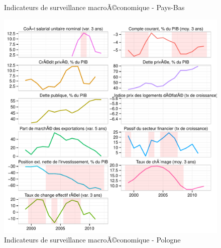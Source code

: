 \documentclass{article}\usepackage[]{graphicx}\usepackage[]{color}
\makeatletter
\def\maxwidth{ %
  \ifdim\Gin@nat@width>\linewidth
    \linewidth
  \else
    \Gin@nat@width
  \fi
}
\newenvironment{knitrout}{}{} %
\makeatother
\begin{document}
\begin{knitrout}
\begin{figure}[p]
{}

\caption[Indicateurs de surveillance macroÃ©conomique - Pays-Bas]{Indicateurs de surveillance macroÃ©conomique - Pays-Bas\label{fig:byco21}}
\end{figure}

\begin{figure}[p]


{\centering \includegraphics[width=\maxwidth]{figure_graph/byco22} 

}

\caption[Indicateurs de surveillance macroÃ©conomique - Pologne]{Indicateurs de surveillance macroÃ©conomique - Pologne\label{fig:byco22}}
\end{figure}

\begin{figure}[p]



\end{figure}
\end{knitrout}
\end{document}
